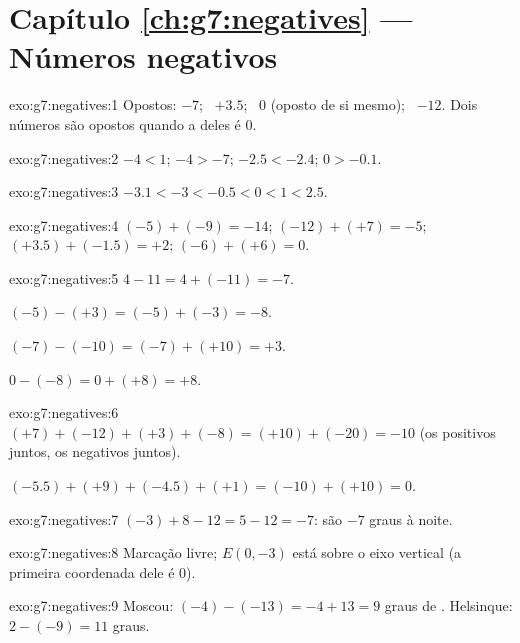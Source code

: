 \section*{Capítulo \ref{ch:g7:negatives} --- Números negativos}

\begin{solution}{exo:g7:negatives:1}
Opostos: $-7$; \ $+3.5$; \ $0$ (oposto de si mesmo); \ $-12$. Dois
números são opostos quando a  deles é $0$.
\end{solution}

\begin{solution}{exo:g7:negatives:2}
$-4 < 1$; \quad $-4 > -7$; \quad $-2.5 < -2.4$; \quad $0 > -0.1$.
\end{solution}

\begin{solution}{exo:g7:negatives:3}
$-3.1 < -3 < -0.5 < 0 < 1 < 2.5$.
\end{solution}

\begin{solution}{exo:g7:negatives:4}
$(-5) + (-9) = -14$; \quad
$(-12) + (+7) = -5$; \quad
$(+3.5) + (-1.5) = +2$; \quad
$(-6) + (+6) = 0$.
\end{solution}

\begin{solution}{exo:g7:negatives:5}
$4 - 11 = 4 + (-11) = -7$.

$(-5) - (+3) = (-5) + (-3) = -8$.

$(-7) - (-10) = (-7) + (+10) = +3$.

$0 - (-8) = 0 + (+8) = +8$.
\end{solution}

\begin{solution}{exo:g7:negatives:6}
$(+7) + (-12) + (+3) + (-8) = (+10) + (-20) = -10$ (os positivos
juntos, os negativos juntos).

$(-5.5) + (+9) + (-4.5) + (+1) = (-10) + (+10) = 0$.
\end{solution}

\begin{solution}{exo:g7:negatives:7}
$(-3) + 8 - 12 = 5 - 12 = -7$: são $-7$ graus à noite.
\end{solution}

\begin{solution}{exo:g7:negatives:8}
Marcação livre; $E(0, -3)$ está sobre o eixo vertical (a primeira
coordenada dele é $0$).
\end{solution}

\begin{solution}{exo:g7:negatives:9}
Moscou: $(-4) - (-13) = -4 + 13 = 9$ graus de . Helsinque:
$2 - (-9) = 11$ graus.
\end{solution}

